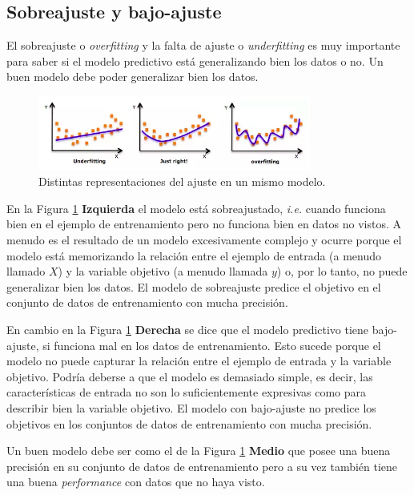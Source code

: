 \documentclass[a4paper,12pt]{article}
\begin{document}
\subsection{Sobreajuste y bajo-ajuste}
El sobreajuste o \textit{overfitting} y la falta de ajuste o \textit{underfitting} \cite{quora} es muy importante para saber si el modelo predictivo está generalizando bien los datos o no. Un buen modelo debe poder generalizar bien los datos.

\begin{figure}[H]
	\begin{center}				
	\includegraphics[width=0.8\textwidth]{026.png}
  	\caption{Distintas representaciones del ajuste en un mismo modelo.}
  	\label{fig:fitting}
  	\end{center}
\end{figure}

En la Figura \ref{fig:fitting} \textbf{Izquierda} el modelo está sobreajustado, \textit{i.e.} cuando funciona bien en el ejemplo de entrenamiento pero no funciona bien en datos no vistos. A menudo es el resultado de un modelo excesivamente complejo y ocurre porque el modelo está memorizando la relación entre el ejemplo de entrada (a menudo llamado $X$) y la variable objetivo (a menudo llamada $y$) o, por lo tanto, no puede generalizar bien los datos. El modelo de sobreajuste predice el objetivo en el conjunto de datos de entrenamiento con mucha precisión.

En cambio en la Figura \ref{fig:fitting} \textbf{Derecha} se dice que el modelo predictivo tiene bajo-ajuste, si funciona mal en los datos de entrenamiento. Esto sucede porque el modelo no puede capturar la relación entre el ejemplo de entrada y la variable objetivo. Podría deberse a que el modelo es demasiado simple, es decir, las características de entrada no son lo suficientemente expresivas como para describir bien la variable objetivo. El modelo con bajo-ajuste no predice los objetivos en los conjuntos de datos de entrenamiento con mucha precisión.

Un buen modelo debe ser como el de la Figura \ref{fig:fitting} \textbf{Medio} que posee una buena precisión en su conjunto de datos de entrenamiento pero a su vez también tiene una buena \textit{performance} con datos que no haya visto.
\end{document}
